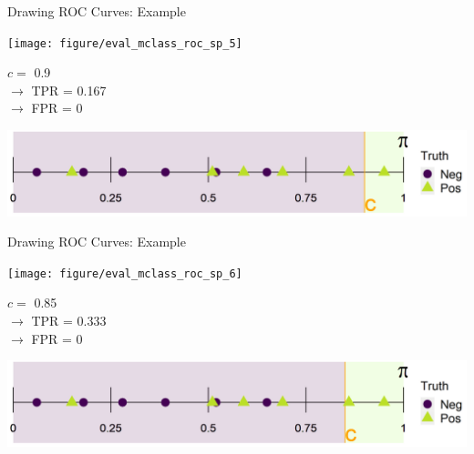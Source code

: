
\begin{vbframe}{Drawing ROC Curves: Example}
	
	
	\begin{knitrout}\scriptsize
		\color{fgcolor}
		
		{
			\texttt{[image: figure/eval\_mclass\_roc\_sp\_5]} 
		}
		
	\end{knitrout}
	
	\vfill
	
	\begin{minipage}[b]{0.3\textwidth}
		$c =$ 0.9\\ 
		$\rightarrow$ TPR = 0.167 \\
		$\rightarrow$ FPR = 0
	\end{minipage}%
	\begin{minipage}[b]{0.7\textwidth}
		\includegraphics{figure/roc_horizontal_step_1} 
	\end{minipage}
	
\end{vbframe}


\begin{vbframe}{Drawing ROC Curves: Example}
	
	\begin{knitrout}\scriptsize
		\color{fgcolor}
		
		{
			\texttt{[image: figure/eval\_mclass\_roc\_sp\_6]}
		}
		
	\end{knitrout}
	
	\vfill
	
	\begin{minipage}[b]{0.3\textwidth}
		$c =$ 0.85\\ 
		$\rightarrow$ TPR = 0.333 \\
		$\rightarrow$ FPR = 0
	\end{minipage}%
	\begin{minipage}[b]{0.7\textwidth}
		\includegraphics{figure/roc_horizontal_step_2} 
	\end{minipage}
	
\end{vbframe}

